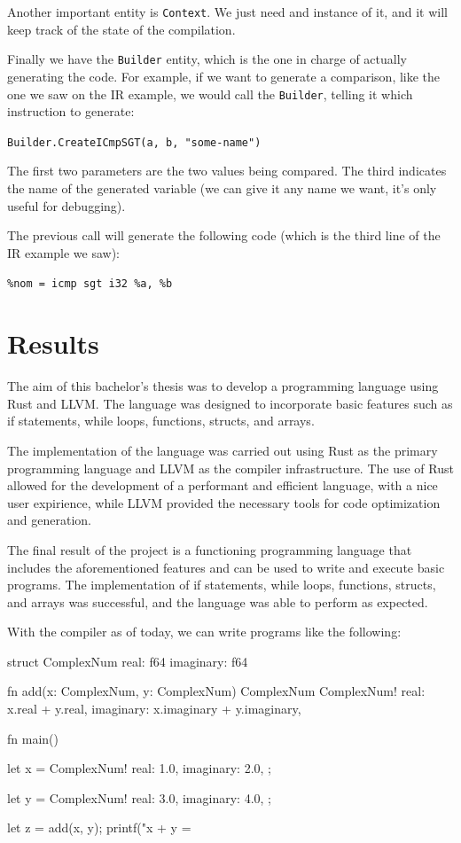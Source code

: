 ﻿\documentclass[10pt,a4paper,twocolumn,twoside]{article}
\begin{document}
Another important entity is \texttt{Context}. We just need and instance of it, 
and it will keep track of the state of the compilation.

Finally we have the \texttt{Builder} entity, which is the one in charge of 
actually generating the code. For example, if we want to generate a comparison,
like the one we saw on the IR example, we would call the \texttt{Builder}, 
telling it which instruction to generate:

\texttt{Builder.CreateICmpSGT(a, b, "some-name")}

The first two parameters are the two values being compared. The third 
indicates the name of the generated variable (we can give it any name we want,
it's only useful for debugging).

The previous call will generate the following code (which is the third line of
the IR example we saw):

\texttt{\%nom = icmp sgt i32 \%a, \%b}

\section{Results}
The aim of this bachelor's thesis was to develop a programming language using
Rust and LLVM. The language was designed to incorporate basic features such as
if statements, while loops, functions, structs, and arrays.

The implementation of the language was carried out using Rust as the primary
programming language and LLVM as the compiler infrastructure. The use of Rust
allowed for the development of a performant and efficient language, with a nice
user expirience, while LLVM provided the necessary tools for code optimization
and generation.

The final result of the project is a functioning programming language that
includes the aforementioned features and can be used to write and execute basic
programs. The implementation of if statements, while loops, functions, structs,
and arrays was successful, and the language was able to perform as expected.

With the compiler as of today, we can write programs like the following:

\begin{code}
struct ComplexNum {
    real:      f64
    imaginary: f64
}

fn add(x: ComplexNum, y: ComplexNum) ComplexNum {
    ComplexNum!{
        real: x.real + y.real,
        imaginary: x.imaginary + y.imaginary,
    }
}

fn main() {
    let x = ComplexNum!{
        real: 1.0,
        imaginary: 2.0,
    };

    let y = ComplexNum!{
        real: 3.0,
        imaginary: 4.0,
    };

    let z = add(x, y);
    printf("x + y = %
}
\end{code}
\end{document}
